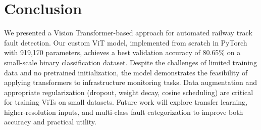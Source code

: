 \documentclass[10pt,twocolumn,letterpaper]{article}
\begin{document}
\section{Conclusion}
\label{sec:conclusion}

We presented a Vision Transformer-based approach for automated railway track fault detection. Our custom ViT model, implemented from scratch in PyTorch with 919,170 parameters, achieves a best validation accuracy of 80.65\% on a small-scale binary classification dataset. Despite the challenges of limited training data and no pretrained initialization, the model demonstrates the feasibility of applying transformers to infrastructure monitoring tasks. Data augmentation and appropriate regularization (dropout, weight decay, cosine scheduling) are critical for training ViTs on small datasets. Future work will explore transfer learning, higher-resolution inputs, and multi-class fault categorization to improve both accuracy and practical utility.

\end{document}
